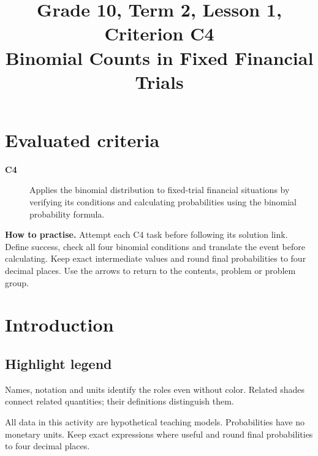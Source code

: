 \makeatletter
{}
\makeatother


\GTenHighlightsfalse %

\CoordinatedTermTwoPalette
\usepackage{needspace}
\setlength{\emergencystretch}{2em}
\title{Grade 10, Term 2, Lesson 1, Criterion C4\\Binomial Counts in Fixed Financial Trials}
\author{}
\date{}

\maketitle
\setcounter{tocdepth}{1}
\setcounter{secnumdepth}{2}
\label{toc}
\tableofcontents
\section*{Evaluated criteria}
\begin{description}
\item[\textbf{C4}] Applies the binomial distribution to fixed-trial financial situations by verifying its conditions and calculating probabilities using the binomial probability formula.
\end{description}
\textbf{How to practise.} Attempt each C4 task before following its solution link. Define success, check all four binomial conditions and translate the event before calculating. Keep exact intermediate values and round final probabilities to four decimal places. Use the arrows to return to the contents, problem or problem group.
\clearpage
\section{Introduction}\label{sec:t2-c4-introduction}
\subsection*{Highlight legend}
\label{tab:highlight-legend}
Names, notation and units identify the roles even without color. Related shades connect related quantities; their definitions distinguish them.

All data in this activity are hypothetical teaching models. Probabilities have no monetary units. Keep exact expressions where useful and round final probabilities to four decimal places.
